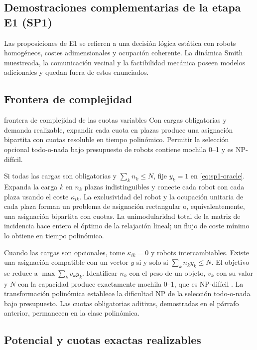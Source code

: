 \subsection{Demostraciones complementarias de la etapa E1 (SP1)}
\label{app:sp1-proofs}

Las proposiciones de E1 se refieren a una decisión lógica estática con robots homogéneos, costes adimensionales y ocupación coherente. La dinámica Smith muestreada, la comunicación vecinal y la factibilidad mecánica poseen modelos adicionales y quedan fuera de estos enunciados.

\subsection{Frontera de complejidad}
\label{app:sp1-complexity}

\begin{contribucion}{frontera de complejidad de las cuotas variables}
Con cargas obligatorias y demanda realizable, expandir cada cuota en plazas produce una asignación bipartita con cuotas resoluble en tiempo polinómico. Permitir la selección opcional todo-o-nada bajo presupuesto de robots contiene mochila 0--1 y es NP-difícil.
\end{contribucion}

Si todas las cargas son obligatorias y $\sum_kn_k\leq N$, fije $y_k=1$ en \eqref{eq:sp1-oracle}. Expanda la carga $k$ en $n_k$ plazas indistinguibles y conecte cada robot con cada plaza usando el coste $\kappa_{ik}$. La exclusividad del robot y la ocupación unitaria de cada plaza forman un problema de asignación rectangular o, equivalentemente, una asignación bipartita con cuotas. La unimodularidad total de la matriz de incidencia hace entero el óptimo de la relajación lineal; un flujo de coste mínimo lo obtiene en tiempo polinómico.

Cuando las cargas son opcionales, tome $\kappa_{ik}=0$ y robots intercambiables. Existe una asignación compatible con un vector $y$ si y solo si $\sum_kn_ky_k\leq N$. El objetivo se reduce a $\max\sum_kv_ky_k$. Identificar $n_k$ con el peso de un objeto, $v_k$ con su valor y $N$ con la capacidad produce exactamente mochila 0--1, que es NP-difícil \parencite{karp1972reducibility}. La transformación polinómica establece la dificultad NP de la selección todo-o-nada bajo presupuesto. Las cuotas obligatorias aditivas, demostradas en el párrafo anterior, permanecen en la clase polinómica.

\subsection{Potencial y cuotas exactas realizables}
\label{app:sp1-feasible-proof}

